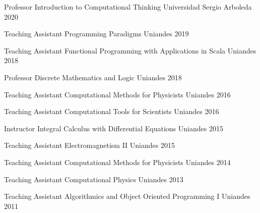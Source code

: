 


\begin{cvteachings}

    \cvteaching
    {Professor}
    {Introduction to Computational Thinking}
    {Universidad Sergio Arboleda}
    {2020}

    \cvteaching
    {Teaching Assistant}
    {Programming Paradigms}
    {Uniandes}
    {2019}

    \cvteaching
    {Teaching Assistant}
    {Functional Programming with Applications in Scala}
    {Uniandes}
    {2018}

    \cvteaching
    {Professor}
    {Discrete Mathematics and Logic}
    {Uniandes}
    {2018}

    \cvteaching
    {Teaching Assistant} %
    {Computational Methods for Physicists} %
    {Uniandes} %
    {2016} %

    \cvteaching
    {Teaching Assistant} %
    {Computational Tools for Scientists} %
    {Uniandes} %
    {2016} %

    \cvteaching
    {Instructor} %
    {Integral Calculus with Differential Equations} %
    {Uniandes} %
    {2015} %

    \cvteaching
    {Teaching Assistant} %
    {Electromagnetism II} %
    {Uniandes} %
    {2015} %

    \cvteaching
    {Teaching Assistant} %
    {Computational Methods for Physicists} %
    {Uniandes} %
    {2014} %

    \cvteaching
    {Teaching Assistant} %
    {Computational Physics} %
    {Uniandes} %
    {2013} %

    \cvteaching
    {Teaching Assistant} %
    {Algorithmics and Object Oriented Programming I} %
    {Uniandes} %
    {2011} %

\end{cvteachings}
